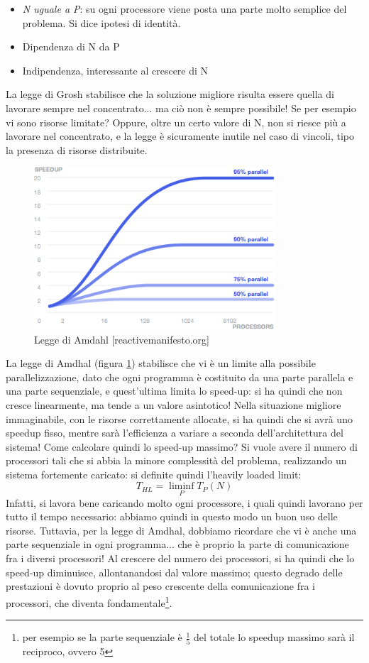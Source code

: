 \begin{itemize}
 \item \textit{N uguale a P}: su ogni processore viene posta una parte molto semplice del problema. Si dice ipotesi
 di identità.
 \item Dipendenza di N da P
 \item Indipendenza, interessante al crescere di N
\end{itemize}
La legge di Grosh stabilisce che la soluzione migliore risulta essere quella
di lavorare sempre nel concentrato... ma ciò non è sempre possibile! Se per 
esempio vi sono risorse limitate? Oppure, oltre un certo valore di N, non si 
riesce più a lavorare nel concentrato, e la legge è sicuramente inutile nel caso 
di vincoli, tipo la presenza di risorse distribuite.
\begin{figure}[htbp]
 \centering
 \includegraphics[width=0.8\textwidth]{Images/amdahl.png}
 \caption{Legge di Amdahl [reactivemanifesto.org]}
 \label{fig:amdahl}
\end{figure}
La legge di Amdhal (figura \ref{fig:amdahl}) stabilisce che vi è un limite alla 
possibile parallelizzazione, dato che ogni programma è
costituito da una parte parallela e una parte sequenziale, e quest'ultima limita lo speed-up: si ha quindi che non
cresce linearmente, ma tende a un valore asintotico! Nella situazione migliore immaginabile, con le risorse
correttamente allocate, si ha quindi che si avrà uno speedup fisso, mentre sarà l'efficienza a variare a seconda
dell'architettura del sistema!
Come calcolare quindi lo speed-up massimo? Si vuole avere il numero di processori tali che si abbia la minore
complessità del problema, realizzando un sistema fortemente caricato: si definite quindi l'heavily loaded limit:
\begin{equation}
 T_{HL} = \liminf_P{T_P(N)}
\end{equation}
Infatti, si lavora bene caricando molto ogni processore, i quali quindi lavorano per tutto il tempo necessario:
abbiamo quindi in questo modo un buon uso delle risorse.
Tuttavia, per la legge di Amdhal, dobbiamo ricordare che vi è anche una parte sequenziale in ogni programma... che è
proprio la parte di comunicazione fra i diversi processori! Al crescere del numero dei processori, si ha quindi
che lo speed-up diminuisce, allontanandosi dal valore massimo; questo degrado delle prestazioni è dovuto proprio al
peso crescente della comunicazione fra i processori, che diventa fondamentale\footnote{per esempio se la parte
sequenziale è $\frac{1}{5}$ del totale lo speedup massimo sarà il reciproco, ovvero 5}.
